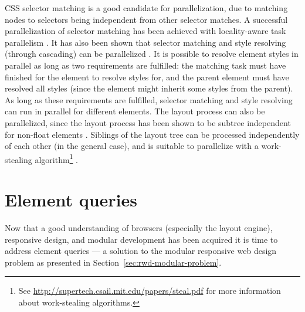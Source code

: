\documentclass[a4paper,11pt]{kth-mag}
\begin{document}
        \gls{CSS} selector matching is a good candidate for parallelization, due to matching nodes to selectors being independent from other selector matches.
        A successful parallelization of selector matching has been achieved with locality-aware task parallelism \cite{parallelizing_the_web_browser}.
        It has also been shown that selector matching and style resolving (through cascading) can be parallelized \cite{zoomm}.
        It is possible to resolve \gls{element} styles in parallel as long as two requirements are fulfilled: the matching task must have finished for the \gls{element} to resolve styles for, and the parent \gls{element} must have resolved all styles (since the \gls{element} might inherit some styles from the parent).
        As long as these requirements are fulfilled, selector matching and style resolving can run in parallel for different \glspl{element}.
        The layout process can also be parallelized, since the layout process has been shown to be subtree independent for non-float \glspl{element} \cite{servo_parallel,servo_blog}.
        Siblings of the layout tree can be processed independently of each other (in the general case), and is suitable to parallelize with a work-stealing algorithm\footnote{See \url{http://supertech.csail.mit.edu/papers/steal.pdf} for more information about work-stealing algorithms.} \cite{meyerovich2010fast}.


  \chapter{Element queries}\label{chp:eq}
    Now that a good understanding of \glspl{browser} (especially the \gls{layout engine}), \gls{responsive} design, and modular development has been acquired it is time to address element queries --- a solution to the modular \gls{responsive} \gls{web} design problem as presented in Section~\ref{sec:rwd-modular-problem}.
    
\end{document}
